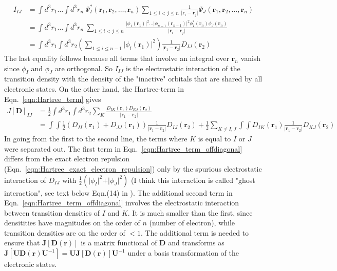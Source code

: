 \documentclass[journal=jacsat,manuscript=article]{achemso}
\newcommand\m[1]{\mathbf{#1}}
\renewcommand\vec[1]{\mathbf{#1}}
\begin{document}
\begin{equation}
  \begin{split}
I_{IJ} &= \int d^3r_1 \ldots \int d^3r_n ~ 
\Psi^*_{I}(\vec{r}_1,\vec{r}_2,\ldots,\vec{r}_n)
\sum_{1 \leq i < j \leq n} \frac{1}{\vert \vec{r}_i - \vec{r}_j \vert}
\Psi_{J}(\vec{r}_1,\vec{r}_2,\ldots,\vec{r}_n) \\
&= \int d^3r_1 \ldots \int d^3r_n ~ 
\sum_{1 \leq i < j \leq n} \frac{
  \vert \phi_1(\vec{r}_1) \vert^2 \ldots \vert \phi_{n-1}(\vec{r}_{n-1}) \vert^2 \phi^*_I(\vec{r}_n) \phi_J(\vec{r}_n)
  }{\vert \vec{r}_i - \vec{r}_j \vert} \\
&= \int d^3r_1 \int d^3r_2 \left(\sum_{1 \leq i \leq n-1} \vert \phi_i(\vec{r}_1) \vert^2 \right)
  \frac{1}{\vert \vec{r}_1 - \vec{r}_2 \vert}
  D_{IJ}(\vec{r}_2) \label{eqn:Hartree_exact_electron_repulsion}
  \end{split}
\end{equation}
The last equality follows because all terms that involve an integral over $\vec{r}_n$ vanish since $\phi_I$ and $\phi_J$ are orthogonal.
So $I_{IJ}$ is the electrostatic interaction of the transition density with the density of the "inactive" orbitals
that are shared by all electronic states. On the other hand, the Hartree-term in Eqn.~\ref{eqn:Hartree_term} gives
\begin{align}
 J[\m{D}]_{IJ} &= \frac{1}{2} \int d^3r_1 \int d^3r_2 \sum_K \frac{D_{IK}(\vec{r}_1) D_{KJ}(\vec{r}_2)}{\vert \vec{r}_1 - \vec{r}_2 \vert} \\
 &= \int \int \frac{1}{2} 
  \left( D_{II}(\vec{r}_1) + D_{JJ}(\vec{r}_1) \right)
  \frac{1}{\vert \vec{r}_1 - \vec{r}_2 \vert}
  D_{IJ}(\vec{r}_2) +
  \frac{1}{2} \sum_{K \neq I,J} \int \int D_{IK}(\vec{r}_1) \frac{1}{\vert \vec{r}_1 - \vec{r}_2 \vert} D_{KJ}(\vec{r}_2)
  \label{eqn:Hartree_term_offdiagonal}
\end{align}
In going from the first to the second line, the terms where $K$ is equal to $I$ or $J$ were separated out.
The first term in Eqn.~\ref{eqn:Hartree_term_offdiagonal} differs from the exact electron repulsion (Eqn.~\ref{eqn:Hartree_exact_electron_repulsion})
only by the spurious electrostatic interaction of $D_{IJ}$ with $\frac{1}{2} (\vert \phi_I \vert^2 + \vert \phi_J \vert^2)$
(I think this interaction is called "ghost interaction", see text below Eqn.(14) in \cite{Pastorczak2014}).
The additional second term in Eqn.~\ref{eqn:Hartree_term_offdiagonal} involves the electrostatic interaction
between transition densities of $I$ and $K$. It is much smaller than the first, since densitities have magnitudes
on the order of $n$ (number of electron), while transition densities are on the order of $<1$.
The additional term is needed to ensure that $\m{J}[\m{D}(\vec{r})]$ is a matrix functional of $\m{D}$ and transforms as
$\m{J}[\m{U} \m{D}(\vec{r}) \m{U}^{-1}] = \m{U} \m{J}[\m{D}(\vec{r})] \m{U}^{-1}$ under a basis transformation of the electronic states.
\end{document}
